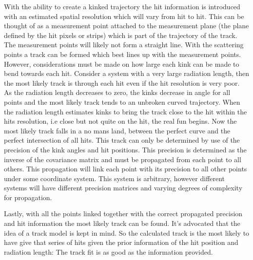 \begin{changemargin}{1em}{2em}
With the ability to create a kinked trajectory the hit information is introduced with an estimated spatial resolution which will vary from hit to hit. This can be thought of as a measurement point attached to the measurement plane (the plane defined by the hit pixels or strips) which is part of the trajectory of the track. The measurement points will likely not form a straight line. With the scattering points a track can be formed which best lines up with the measurement points. However, considerations must be made on how large each kink can be made to bend towards each hit. Consider a system with a very large radiation length, then the most likely track is through each hit even if the hit resolution is very poor. As the radiation length decreases to zero, the kinks decrease in angle for all points and the most likely track tends to an unbroken curved trajectory. When the radiation length estimates kinks to bring the track close to the hit within the hits resolution, i.e close but not quite on the hit, the real fun begins. Now the most likely track falls in a no mans land, between the perfect curve and the perfect intersection of all hits. This track can only be determined by use of the precision of the kink angles and hit positions. This precision is determined as the inverse of the covariance matrix and must be propagated from each point to all others. This propagation will link each point with its precision to all other points under some coordinate system. This system is arbitrary, however different systems will have different precision matrices and varying degrees of complexity for propagation.  

Lastly, with all the points linked together with the correct propagated precision and hit information the most likely track can be found. It's advocated that the idea of a track model is kept in mind. So the calculated track is the most likely to have give that series of hits given the prior information of the hit position and radiation length: The track fit is as good as the information provided.   
\end{changemargin}

